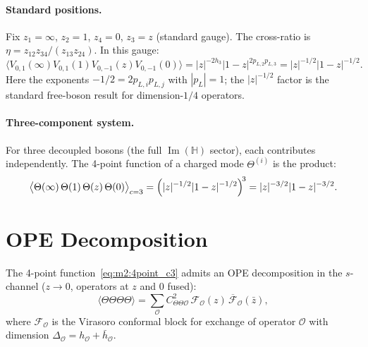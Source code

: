 \documentclass[12pt,a4paper]{article}
\theoremstyle{definition}
\theoremstyle{remark}
\begin{document}
\paragraph{Standard positions.}
Fix $z_1 = \infty$, $z_2 = 1$, $z_4 = 0$, $z_3 = z$ (standard gauge).
The cross-ratio is $\eta = z_{12}z_{34}/(z_{13}z_{24})$.  In this gauge:
\begin{equation}
  \bigl\langle V_{0,1}(\infty) V_{0,1}(1) V_{0,-1}(z) V_{0,-1}(0)
  \bigr\rangle
  = |z|^{-2h_{3}} |1-z|^{2 p_{L,2} p_{L,3}}
  = |z|^{-1/2} |1-z|^{-1/2}.
  \label{eq:m2:4point_gauge}
\end{equation}
Here the exponents $-1/2 = 2 p_{L,i} p_{L,j}$ with $|p_L| = 1$; the
$|z|^{-1/2}$ factor is the standard free-boson result for dimension-$1/4$
operators.

\paragraph{Three-component system.}
For three decoupled bosons (the full $\operatorname{Im}(\mathbb{H})$ sector),
each contributes independently.  The 4-point function of a charged mode
$\Theta^{(i)}$ is the product:
\begin{equation}
  \bigl\langle \Theta(\infty)\, \Theta(1)\, \Theta(z)\, \Theta(0)
  \bigr\rangle_{c=3}
  = \Bigl(|z|^{-1/2} |1-z|^{-1/2}\Bigr)^{\!3}
  = |z|^{-3/2} |1-z|^{-3/2}.
  \label{eq:m2:4point_c3}
\end{equation}

\section{OPE Decomposition}
\label{sec:m2:ope}

The 4-point function~\eqref{eq:m2:4point_c3} admits an OPE decomposition in the
$s$-channel ($z \to 0$, operators at $z$ and $0$ fused):
\begin{equation}
  \bigl\langle \Theta \Theta \Theta \Theta \bigr\rangle
  = \sum_{\mathcal{O}} C_{\Theta\Theta\mathcal{O}}^2
    \, \mathcal{F}_{\mathcal{O}}(z) \, \overline{\mathcal{F}}_{\mathcal{O}}(\bar{z}),
  \label{eq:m2:ope_sum}
\end{equation}
where $\mathcal{F}_{\mathcal{O}}$ is the Virasoro conformal block for exchange
of operator $\mathcal{O}$ with dimension $\Delta_{\mathcal{O}} = h_{\mathcal{O}} + \bar{h}_{\mathcal{O}}$.
\end{document}
